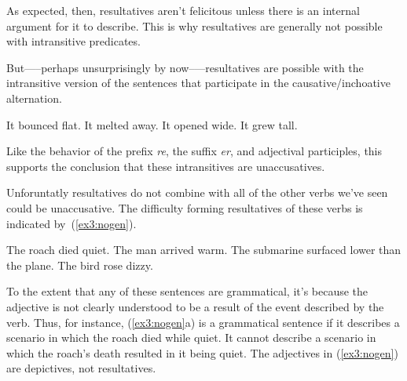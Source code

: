 As expected, then, resultatives aren't felicitous unless there is an internal argument for it to describe. This is why resultatives are generally not possible with intransitive predicates.
\begin{exe}
\raggedright
	\ex \label{ex3:nointres}
	\begin{xlist}
	\end{xlist}
\end{exe}
But—--perhaps unsurprisingly by now--—resultatives are possible with the intransitive version of the sentences that participate in the causative/inchoative alternation.
\begin{exe}
\raggedright
	\ex \label{ex3:resincho}
	\begin{xlist}
		\ex It bounced flat.
		\ex It melted away.
		\ex It opened wide.
		\ex It grew tall.
	\end{xlist}
\end{exe}
Like the behavior of the prefix \textit{re}, the suffix \textit{er}, and adjectival participles, this supports the conclusion that these intransitives are unaccusatives.

Unforuntatly resultatives do not combine with all of the other verbs we've seen could be unaccusative. The difficulty forming resultatives of these verbs is indicated by~(\ref{ex3:nogen}).
\begin{exe}
\raggedright
	\ex \label{ex3:nogen}
	\begin{xlist}
		\ex The roach died quiet.
		\ex The man arrived warm.
		\ex The submarine surfaced lower than the plane.
		\ex The bird rose dizzy.
	\end{xlist}
\end{exe}
To the extent that any of these sentences are grammatical, it's because the adjective is not clearly understood to be a result of the event described by the verb. Thus, for instance, (\ref{ex3:nogen}a) is a grammatical sentence if it describes a scenario in which the roach died while quiet. It cannot describe a scenario in which the roach's death resulted in it being quiet. The adjectives in (\ref{ex3:nogen}) are depictives, not resultatives. 

